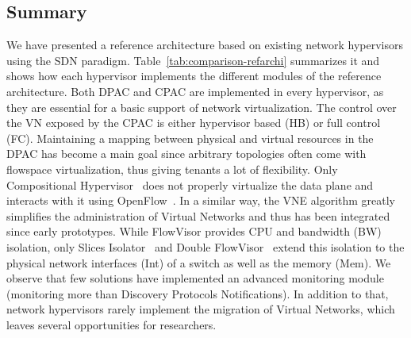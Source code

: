 \subsection{Summary}
We have presented a reference architecture based on existing network hypervisors using the SDN paradigm.
Table~\ref{tab:comparison-refarchi} summarizes it and shows how each hypervisor implements the different modules of the reference architecture.
Both DPAC and CPAC are implemented in every hypervisor, as they are essential for a basic support of network virtualization.
The control over the VN exposed by the CPAC is either hypervisor based (HB) or full control (FC).
Maintaining a mapping between physical and virtual resources in the DPAC has become a main goal since arbitrary topologies often come with flowspace virtualization, thus giving tenants a lot of flexibility.
Only Compositional Hypervisor~\cite{CompositionalHypervisor-Jin2014} does not properly virtualize the data plane and interacts with it using OpenFlow~\cite{Openflow-McKeown2008}.
In a similar way, the VNE algorithm greatly simplifies the administration of Virtual Networks and thus has been integrated since early prototypes.
While FlowVisor provides CPU and bandwidth (BW) isolation, only Slices Isolator~\cite{SlicesIsolator-El-Azzab2011} and Double FlowVisor~\cite{DoubleFV-Yin2013} extend this isolation to the physical network interfaces (Int) of a switch as well as the memory (Mem).
We observe that few solutions have implemented an advanced monitoring module (\ie monitoring more than Discovery Protocols Notifications).
In addition to that, network hypervisors rarely implement the migration of Virtual Networks, which leaves several opportunities for researchers.



